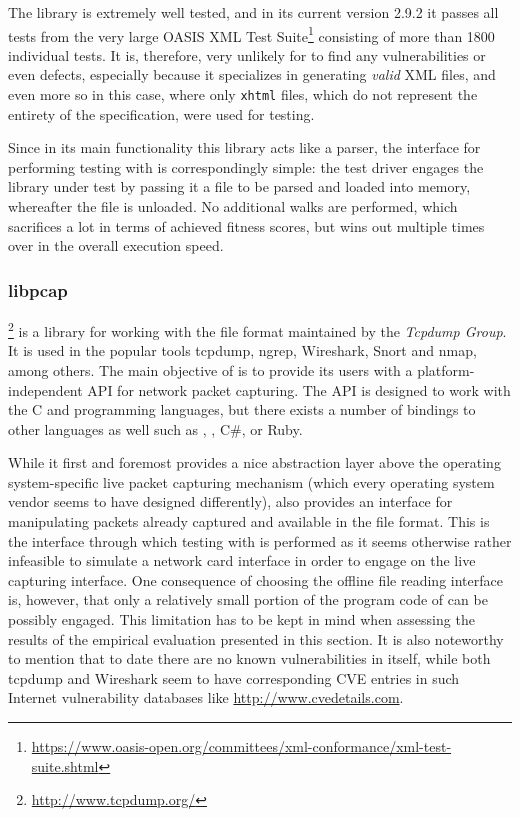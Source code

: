 The library is extremely well tested, and in its current version 2.9.2 it passes all tests from the very large
OASIS XML Test Suite\footnote{\url{https://www.oasis-open.org/committees/xml-conformance/xml-test-suite.shtml}}
consisting of more than 1800 individual tests. It is, therefore, very unlikely for \xmlmate to find any
vulnerabilities or even defects, especially because it specializes in generating \emph{valid} XML files, and
even more so in this case, where only \texttt{xhtml} files, which do not represent the entirety of the \xml
specification, were used for testing.

Since in its main functionality this library acts like a parser, the interface for performing testing with
\xmlmate is correspondingly simple: the test driver engages the library under test by passing it a file to be
parsed and loaded into memory, whereafter the file is unloaded. No additional walks are performed, which
sacrifices a lot in terms of achieved fitness scores, but wins out multiple times over in the
overall execution speed.


\tocless\subsubsection{libpcap}
\libpcap\footnote{\url{http://www.tcpdump.org/}} is a library for working with the \pcap file format
maintained by the \emph{Tcpdump Group}. It is used in the popular tools tcpdump, ngrep, Wireshark, Snort and
nmap, among others. The main objective of \libpcap is to provide its users with a
platform-independent API for network packet capturing. The API is designed to work with the {\small C} and \cpp
programming languages, but there exists a number of bindings to other languages as well such as \python, \java,
{\small C\#}, or {\small Ruby}.

While it first and foremost provides a nice abstraction layer above the operating system-specific live packet
capturing mechanism (which every operating system vendor seems to have designed differently), \libpcap
also provides an interface for manipulating packets already captured and available in the \pcap file format.
This is the interface through which testing with \xmlmate is performed as it seems otherwise rather
infeasible to simulate a network card interface in order to engage \libpng on the live capturing
interface. One consequence of choosing the offline file reading interface is, however, that only a relatively
small portion of the program code of \libpcap can be possibly engaged. This limitation has to be kept
in mind when assessing the results of the empirical evaluation presented in this section. It is also noteworthy
to mention that to date there are no known vulnerabilities in \libpcap itself, while both tcpdump and
Wireshark seem to have corresponding CVE entries in such Internet vulnerability databases like
\url{http://www.cvedetails.com}.

